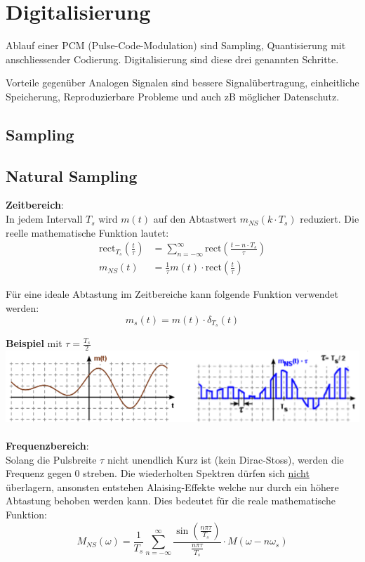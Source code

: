 \section{Digitalisierung}
Ablauf einer PCM (Pulse-Code-Modulation) sind Sampling, Quantisierung mit anschliessender Codierung. Digitalisierung sind diese drei genannten Schritte.

Vorteile gegenüber Analogen Signalen sind bessere Signalübertragung, einheitliche Speicherung, Reproduzierbare Probleme und auch zB möglicher Datenschutz.

\subsection{Sampling}
\subsection{Natural Sampling}
\textbf{Zeitbereich}:\\
In jedem Intervall $T_s$ wird $m(t)$ auf den Abtastwert $m_{NS}(k\cdot T_s)$ reduziert. Die reelle mathematische Funktion lautet:
\begin{align*}
	\text{rect}_{T_s}\left(\frac{t}{\tau}\right) &= \sum_{n=-\infty}^{\infty}\text{rect}\left(\frac{t - n\cdot T_s}{\tau}\right) \\
	m_{NS}(t) &= \frac{1}{\tau}m(t)\cdot\text{rect}\left(\frac{t}{\tau}\right)
\end{align*}

Für eine ideale Abtastung im Zeitbereiche kann folgende Funktion verwendet werden:
\[
m_s(t) = m(t)\cdot \delta_{T_s}(t)
\]

\textbf{Beispiel} mit $\tau = \frac{T_s}{2}$\\
\includegraphics[width=\columnwidth]{Images/natural_time}
~\\
\textbf{Frequenzbereich}:\\
Solang die Pulsbreite $\tau$ nicht unendlich Kurz ist (kein Dirac-Stoss), werden die Frequenz gegen 0 streben. Die wiederholten Spektren dürfen sich \underline{nicht} überlagern, ansonsten entstehen Alaising-Effekte welche nur durch ein höhere Abtastung behoben werden kann. Dies bedeutet für die reale mathematische Funktion:
\[
M_{NS}(\omega) = \frac{1}{T_s}\sum_{n=-\infty}^{\infty}\frac{\sin\left(\frac{n\pi\tau}{T_s}\right)}{\frac{n\pi\tau}{T_s}}\cdot M(\omega - n \omega_s)
\]

